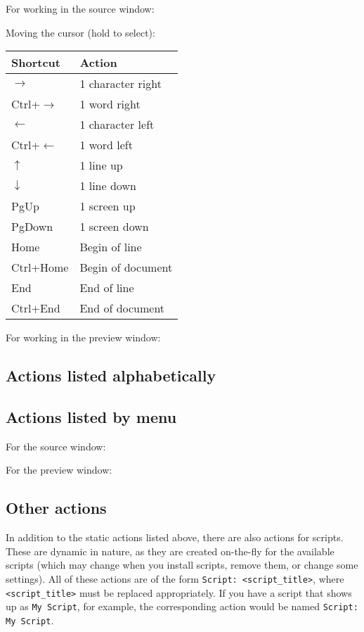 For working in the source window:


Moving the cursor (hold  to select):
\begin{longtable}{Pl}
\toprule
Shortcut & Action \\
\midrule \endhead
$\rightarrow$      & 1 character right \\
Ctrl+$\rightarrow$ & 1 word right \\
$\leftarrow$       & 1 character left \\
Ctrl+$\leftarrow$  & 1 word left \\
$\uparrow$         & 1 line up \\
$\downarrow$       & 1 line down \\
PgUp               & 1 screen up \\
PgDown             & 1 screen down \\
Home               & Begin of line \\
Ctrl+Home          & Begin of document \\
End                & End of line \\
Ctrl+End           & End of document \\
\bottomrule
\end{longtable}

For working in the preview window:


\subsection{Actions listed alphabetically}


\subsection{Actions listed by menu}

For the source window:


\bigskip
For the preview window:


\subsection{Other actions}
In addition to the static actions listed above, there are also actions for scripts. These are dynamic in nature, as they are created on-the-fly for the available scripts (which may change when you install scripts, remove them, or change some settings). All of these actions are of the form \verb*|Script: <script_title>|, where \verb*|<script_title>| must be replaced appropriately. If you have a script that shows up as \verb|My Script|, for example, the corresponding action would be named \verb*|Script: My Script|.


